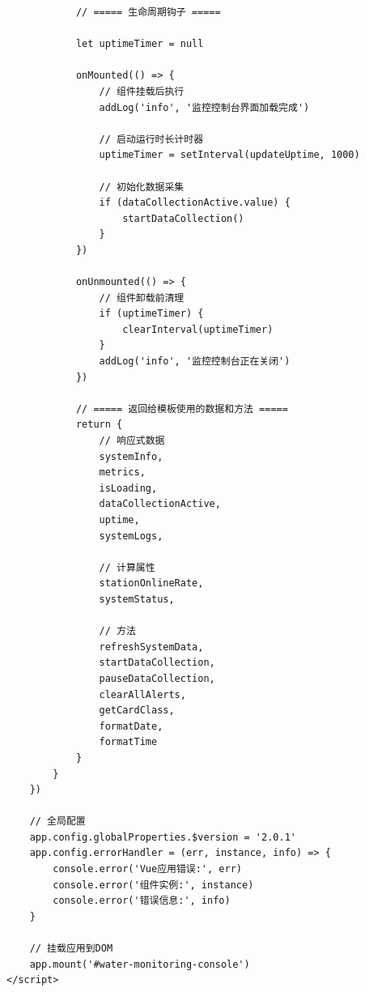 \begin{verbatim}
            // ===== 生命周期钩子 =====
            
            let uptimeTimer = null
            
            onMounted(() => {
                // 组件挂载后执行
                addLog('info', '监控控制台界面加载完成')
                
                // 启动运行时长计时器
                uptimeTimer = setInterval(updateUptime, 1000)
                
                // 初始化数据采集
                if (dataCollectionActive.value) {
                    startDataCollection()
                }
            })
            
            onUnmounted(() => {
                // 组件卸载前清理
                if (uptimeTimer) {
                    clearInterval(uptimeTimer)
                }
                addLog('info', '监控控制台正在关闭')
            })
            
            // ===== 返回给模板使用的数据和方法 =====
            return {
                // 响应式数据
                systemInfo,
                metrics,
                isLoading,
                dataCollectionActive,
                uptime,
                systemLogs,
                
                // 计算属性
                stationOnlineRate,
                systemStatus,
                
                // 方法
                refreshSystemData,
                startDataCollection,
                pauseDataCollection,
                clearAllAlerts,
                getCardClass,
                formatDate,
                formatTime
            }
        }
    })
    
    // 全局配置
    app.config.globalProperties.$version = '2.0.1'
    app.config.errorHandler = (err, instance, info) => {
        console.error('Vue应用错误:', err)
        console.error('组件实例:', instance)
        console.error('错误信息:', info)
    }
    
    // 挂载应用到DOM
    app.mount('#water-monitoring-console')
</script>
\end{verbatim}

